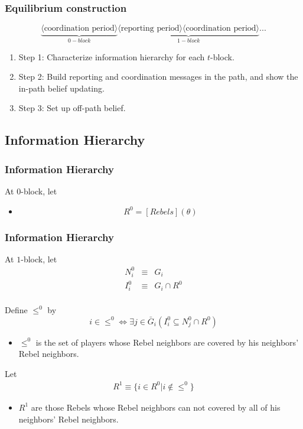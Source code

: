 \documentclass[10pt]{beamer}
\begin{document}
\begin{frame}
  \frametitle{Equilibrium construction}

\[\underbrace{\langle\text{coordination period}\rangle}_{0-block}\underbrace{\langle\text{reporting period}\rangle \langle\text{coordination period}\rangle}_{1-block}...\]
\begin{enumerate}
\item Step 1: Characterize information hierarchy for each $t$-block.
\item Step 2: Build reporting and coordination messages in the path, and show the in-path belief updating.
\item Step 3: Set up off-path belief.
\end{enumerate}

\end{frame}





\subsection{Information Hierarchy}

\begin{frame}
  \frametitle{Information Hierarchy}

At $0$-block, let
  \begin{itemize}
  \item \[R^0=[Rebels](\theta)\]
  \end{itemize}


\end{frame}



\begin{frame}
  \frametitle{Information Hierarchy}

At $1$-block, let
\begin{eqnarray*}
N^0_i & \equiv &  G_i\\
I^0_i & \equiv & G_i\cap R^0\\
\end{eqnarray*}

Define $\leq^0$ by
\[i\in \leq^0 \Leftrightarrow \exists  j\in \bar{G}_i (I^0_i\subseteq N^0_j\cap R^0)\] 
\begin{itemize}
\item $\leq^0$ is the set of players whose Rebel neighbors are covered by his neighbors' Rebel neighbors.
\end{itemize}

Let 
\begin{eqnarray*}
R^{1} \equiv \{i\in R^0|i\notin \leq^0\}
\end{eqnarray*}

\begin{itemize}
\item $R^1$ are those Rebels whose Rebel neighbors can not covered by all of his neighbors' Rebel neighbors.
\end{itemize}


\end{frame}
\end{document}
